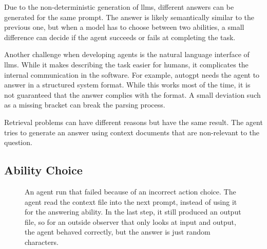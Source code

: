 \documentclass[../main.tex]{subfiles}
\begin{document}
Due to the non-deterministic generation of \glspl{llm},
different answers can be generated for the same prompt.
The answer is likely semantically similar to the previous one,
but when a model has to choose between two abilities,
a small difference can decide if the agent succeeds or fails at completing the task.

Another challenge when developing agents
is the natural language interface of \glspl{llm}.
While it makes describing the task easier for humans,
it complicates the internal communication in the software.
For example,
\gls{autogpt} needs the agent to answer in a structured system format.
While this works most of the time,
it is not guaranteed that the answer complies with the format.
A small deviation such as a missing bracket can break the parsing process.

Retrieval problems can have different reasons but have the same result.
The agent tries to generate an answer using context documents that are
non-relevant to the question.

\subsection{Ability Choice}

\begin{figure}[t]
      \centering
      \caption{An agent run that failed because of an incorrect action choice.
            The agent read the context file into the next prompt,
            instead of using it for the answering ability.
            In the last step, it still produced an output file,
            so for an outside observer that only looks at input and output,
            the agent behaved correctly, but the answer is just random characters.}
      \label{fig:bad_agent_run}
\end{figure}
\end{document}
